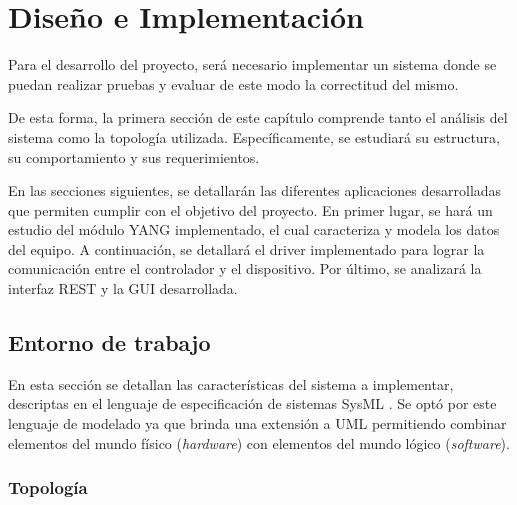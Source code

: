 
\chapter{Diseño e Implementación} %

\label{Chapter4} %
Para el desarrollo del proyecto, será necesario implementar un sistema donde se puedan realizar pruebas y evaluar de este modo la correctitud del mismo. 

De esta forma, la primera sección de este capítulo comprende tanto el análisis del sistema como la topología utilizada. Específicamente, se estudiará su estructura, su comportamiento y sus requerimientos. 

En las secciones siguientes, se detallarán las diferentes aplicaciones desarrolladas que permiten cumplir con el objetivo del proyecto. En primer lugar, se hará un estudio del módulo YANG implementado, el cual caracteriza y modela los datos del equipo. A continuación, se detallará el driver implementado para lograr la comunicación entre el controlador y el dispositivo. Por último, se analizará la interfaz REST y la GUI desarrollada.


\section{Entorno de trabajo}
En esta sección se detallan las características del sistema a implementar, descriptas en el lenguaje de especificación de sistemas SysML \parencite{sysml}. Se optó por este lenguaje de modelado ya que brinda una extensión a UML permitiendo combinar elementos del mundo físico (\textit{hardware}) con elementos del mundo lógico (\textit{software}). 


\subsection{Topología}

